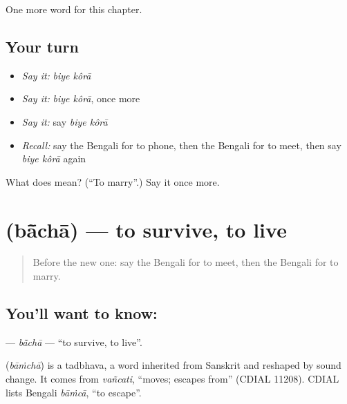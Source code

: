 \begin{grammarlens}[title={What you've built}]
One more word for this chapter.
\end{grammarlens}

\subsection*{Your turn}
\begin{itemize}
\raggedright
  \item \emph{Say it:} \emph{biye kôrā}
  \item \emph{Say it:} \emph{biye kôrā}, once more
  \item \emph{Say it:} say \emph{biye kôrā}
  \item \emph{Recall:} say the Bengali for to phone, then the Bengali for to meet, then say \emph{biye kôrā} again
\end{itemize}

\begin{tcolorbox}[breakable,colback=teal!4,colframe=teal!35!black,title={Before you move on}]
What does   mean? (\textquotedblleft{}To marry\textquotedblright{}.) Say it once more.
\end{tcolorbox}
\section[\texorpdfstring{\bn{বাঁচা} (bā̃chā)}{বাঁচা (bā̃chā)}]{ (bā̃chā) — to survive, to live}

\label{lesson:BN-C210-bacha}



\begin{quote}
Before the new one: say the Bengali for to meet, then the Bengali for to marry.
\end{quote}

\subsection*{You'll want to know: }
\textbf{} — \emph{bā̃chā} — \textquotedblleft{}to survive, to live\textquotedblright{}.

\begin{cousinweb}
\textbf{} (\emph{bāṁchā}) is a tadbhava, a word inherited from Sanskrit and reshaped by sound change. It comes from \emph{vañcati}, \textquotedblleft{}moves; escapes from\textquotedblright{} (CDIAL 11208). CDIAL lists Bengali \emph{bāṁcā}, \textquotedblleft{}to escape\textquotedblright{}.
\end{cousinweb}

